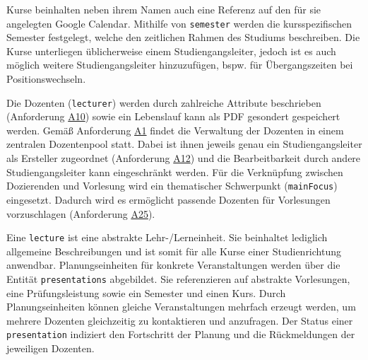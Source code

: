 Kurse beinhalten neben ihrem Namen auch eine Referenz auf den für sie angelegten Google Calendar. 
Mithilfe von \texttt{semester} werden die kursspezifischen Semester festgelegt, welche den zeitlichen Rahmen des Studiums beschreiben.
Die Kurse unterliegen üblicherweise einem Studiengangsleiter, jedoch ist es auch möglich weitere Studiengangsleiter hinzuzufügen, bspw. für Übergangszeiten bei Positionswechseln.

Die Dozenten (\texttt{lecturer}) werden durch zahlreiche Attribute beschrieben (Anforderung \hyperref[tab:Anforderungen]{A10}) sowie ein Lebenslauf kann als PDF gesondert gespeichert werden.
Gemäß Anforderung \hyperref[tab:Anforderungen]{A1} findet die Verwaltung der Dozenten in einem zentralen Dozentenpool statt.
Dabei ist ihnen jeweils genau ein Studiengangsleiter als Ersteller zugeordnet (Anforderung \hyperref[tab:Anforderungen]{A12}) und die Bearbeitbarkeit durch andere Studiengangsleiter kann eingeschränkt werden. 
Für die Verknüpfung zwischen Dozierenden und Vorlesung wird ein thematischer Schwerpunkt (\texttt{mainFocus}) eingesetzt.
Dadurch wird es ermöglicht passende Dozenten für Vorlesungen vorzuschlagen (Anforderung \hyperref[tab:Anforderungen]{A25}).

Eine \texttt{lecture} ist eine abstrakte Lehr-/Lerneinheit.
Sie beinhaltet lediglich allgemeine Beschreibungen und ist somit für alle Kurse einer Studienrichtung anwendbar. 
Planungseinheiten für konkrete Veranstaltungen werden über die Entität \texttt{presentations} abgebildet.
Sie referenzieren auf abstrakte Vorlesungen, eine Prüfungsleistung sowie ein Semester und einen Kurs. 
Durch Planungseinheiten können gleiche Veranstaltungen mehrfach erzeugt werden, um mehrere Dozenten gleichzeitig zu kontaktieren und anzufragen.
Der Status einer \texttt{presentation} indiziert den Fortschritt der Planung und die Rückmeldungen der jeweiligen Dozenten.
